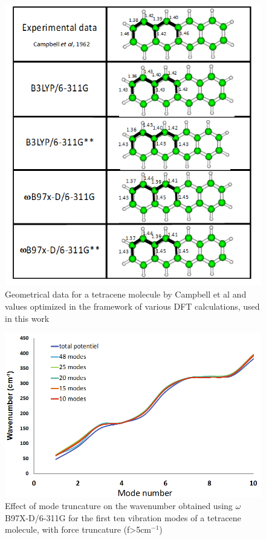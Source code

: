  \begin{figure}[h]
 	\centering
 	\includegraphics[scale=0.8]{image/geometrical-data}
 	\caption[Geometrical data for a tetracene molecule]{Geometrical data for a tetracene molecule by Campbell et al \cite{campbell1962crystal} and values optimized in the framework of various DFT calculations, used in this work}
 \end{figure}
 
 \begin{figure}[h]
 	\centering
 	\includegraphics[scale=0.8]{image/mode-trunc}
 	\caption[Effect of mode truncature on the first ten mode on wavenumber of tetracene ]{Effect of mode truncature on the wavenumber obtained using $\omega$B97X-D/6-311G for the first ten vibration modes of a tetracene molecule, with force truncature (f>5cm$^{-1}$)}
 \end{figure}
 
